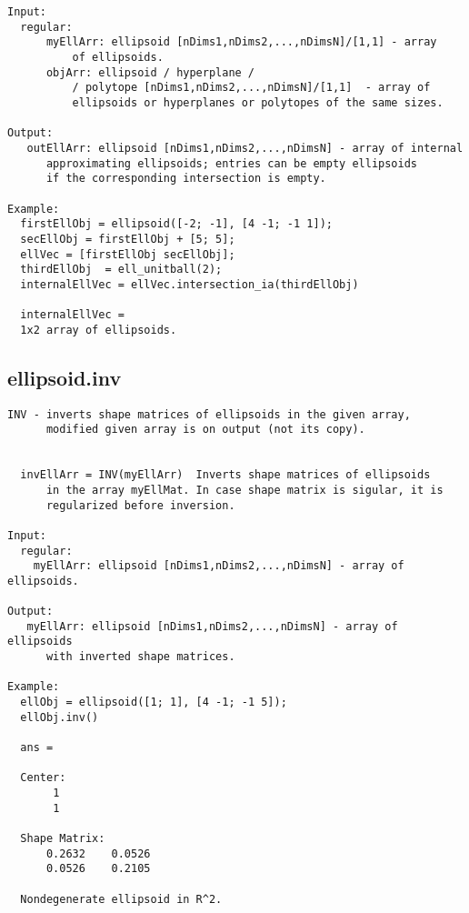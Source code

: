 \begin{verbatim}
Input:
  regular:
      myEllArr: ellipsoid [nDims1,nDims2,...,nDimsN]/[1,1] - array
          of ellipsoids.
      objArr: ellipsoid / hyperplane /
          / polytope [nDims1,nDims2,...,nDimsN]/[1,1]  - array of
          ellipsoids or hyperplanes or polytopes of the same sizes.

Output:
   outEllArr: ellipsoid [nDims1,nDims2,...,nDimsN] - array of internal
      approximating ellipsoids; entries can be empty ellipsoids
      if the corresponding intersection is empty.

Example:
  firstEllObj = ellipsoid([-2; -1], [4 -1; -1 1]);
  secEllObj = firstEllObj + [5; 5];
  ellVec = [firstEllObj secEllObj];
  thirdEllObj  = ell_unitball(2);
  internalEllVec = ellVec.intersection_ia(thirdEllObj)

  internalEllVec =
  1x2 array of ellipsoids.
\end{verbatim}
\subsection{\texorpdfstring{ellipsoid.inv}{inv}}\label{method:ellipsoid.inv}
\begin{verbatim}
INV - inverts shape matrices of ellipsoids in the given array,
      modified given array is on output (not its copy).


  invEllArr = INV(myEllArr)  Inverts shape matrices of ellipsoids
      in the array myEllMat. In case shape matrix is sigular, it is
      regularized before inversion.

Input:
  regular:
    myEllArr: ellipsoid [nDims1,nDims2,...,nDimsN] - array of ellipsoids.

Output:
   myEllArr: ellipsoid [nDims1,nDims2,...,nDimsN] - array of ellipsoids
      with inverted shape matrices.

Example:
  ellObj = ellipsoid([1; 1], [4 -1; -1 5]);
  ellObj.inv()

  ans =

  Center:
       1
       1

  Shape Matrix:
      0.2632    0.0526
      0.0526    0.2105

  Nondegenerate ellipsoid in R^2.
\end{verbatim}
